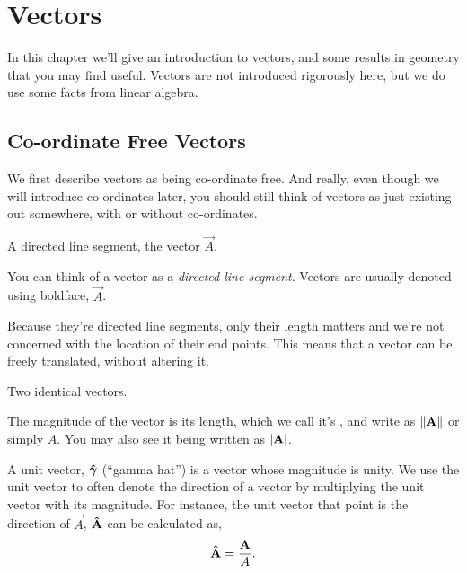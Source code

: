 \setlength{\chnumsep}{14em}
\chapter{Vectors}

\begin{overview}
In this chapter we'll give an introduction to vectors, and some results in
geometry that you may find useful. Vectors are not introduced rigorously here,
but we do use some facts from linear algebra.
\end{overview}

\section{Co-ordinate Free Vectors}

We first describe vectors as being co-ordinate free. And really, even
though we will introduce co-ordinates later, you should still
think of vectors as just existing out somewhere, with or without
co-ordinates.

\begin{marginfigure}
\caption{A directed line segment, the vector \(\vec{A}\).}
\end{marginfigure}

You can think of a  vector as a \emph{directed line segment}.
Vectors are usually denoted using boldface, \(\vec{A}\). 

Because they're directed line segments, only their length matters and
we’re not concerned with the location of their end points. This means that a
vector can be freely translated, without altering it.

\begin{marginfigure}
\caption{Two identical vectors.}
\end{marginfigure}

The magnitude of the vector is its length, which we call it's , and write
as \(\norm{\mathbf{\boldsymbol{A}}}\) or simply \(A\). You may also see it being written as \(\abs{\mathbf{\boldsymbol{A}}}\).

A unit vector, \(\mathbf{\boldsymbol{\hat{\gamma}}}\) (“gamma hat”) is a vector whose magnitude is unity. We use the unit vector to
often denote the direction of a vector by multiplying the unit vector with its magnitude.
For instance, the unit vector that point is the direction of \(\vec{A}\), \(\mathbf{\boldsymbol{\hat{A}}}\) can be calculated as,
\[
\mathbf{\boldsymbol{\hat{A}}} = \frac{\mathbf{\boldsymbol{A}}}{A}.
\]

